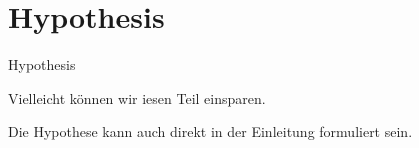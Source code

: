 \chapter{Hypothesis}
\label{cha:Hypothesis}
Hypothesis

Vielleicht können wir iesen Teil einsparen.

Die Hypothese kann auch direkt in der Einleitung formuliert sein.



